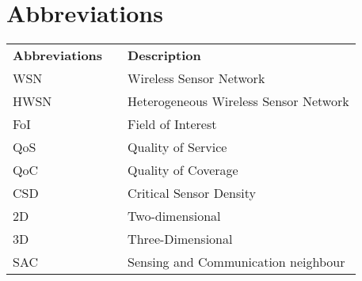 \newpage
\chapter*{\centering Abbreviations}
\begin{center}
\begin{longtable}{lll} 
\textbf{Abbreviations}& & \textbf{Description} \\ 
WSN & &  Wireless Sensor Network\\
HWSN & & Heterogeneous Wireless Sensor Network\\
FoI & & Field of Interest \\
QoS & & Quality of Service \\
QoC & & Quality of Coverage \\
CSD & & Critical Sensor Density \\
2D & & Two-dimensional \\
3D & & Three-Dimensional\\
SAC & & Sensing and Communication neighbour
\end{longtable}
\end{center}

 
